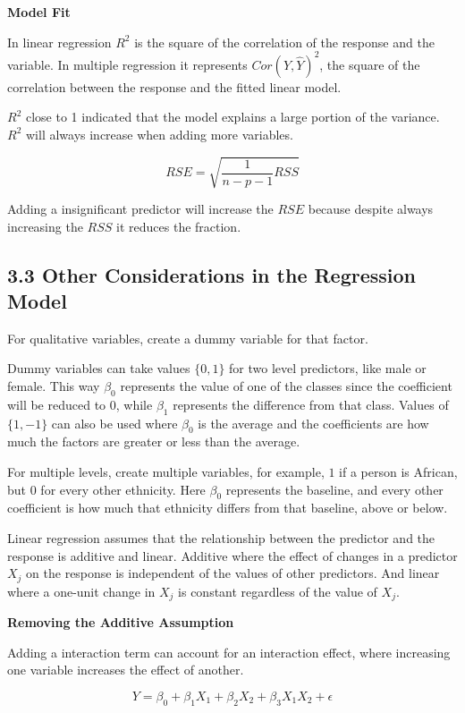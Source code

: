 \documentclass[
]{article}
\begin{document}
\textbf{Model Fit}

In linear regression \(R^2\) is the square of the correlation of the
response and the variable. In multiple regression it represents
\(Cor(Y,\hat{Y})^2\), the square of the correlation between the response
and the fitted linear model.

\(R^2\) close to 1 indicated that the model explains a large portion of
the variance. \(R^2\) will always increase when adding more variables.

\[RSE = \sqrt{\frac{1}{n-p-1}RSS}\]

Adding a insignificant predictor will increase the \(RSE\) because
despite always increasing the \(RSS\) it reduces the fraction.

\hypertarget{header-n87}{%
\subsection{3.3 Other Considerations in the Regression
Model}\label{header-n87}}

For qualitative variables, create a dummy variable for that factor.

Dummy variables can take values \(\{0,1\}\) for two level predictors,
like male or female. This way \(\beta_0\) represents the value of one of
the classes since the coefficient will be reduced to \(0\), while
\(\beta_1\) represents the difference from that class. Values of
\(\{1,-1\}\) can also be used where \(\beta_0\) is the average and the
coefficients are how much the factors are greater or less than the
average.

For multiple levels, create multiple variables, for example, \(1\) if a
person is African, but \(0\) for every other ethnicity. Here \(\beta_0\)
represents the baseline, and every other coefficient is how much that
ethnicity differs from that baseline, above or below.

Linear regression assumes that the relationship between the predictor
and the response is additive and linear. Additive where the effect of
changes in a predictor \(X_j\) on the response is independent of the
values of other predictors. And linear where a one-unit change in
\(X_j\) is constant regardless of the value of \(X_j\).

\textbf{Removing the Additive Assumption}

Adding a interaction term can account for an interaction effect, where
increasing one variable increases the effect of another.

\[Y = \beta_0 + \beta_1X_1 + \beta_2 X_2 + \beta_3 X_1 X_2 + \epsilon\]
\end{document}
